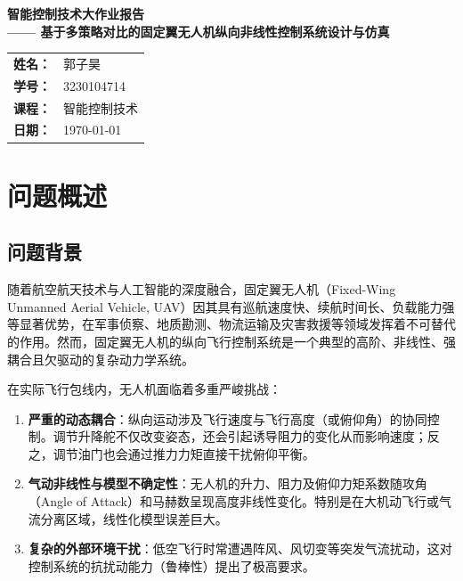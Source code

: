 \documentclass[UTF8, a4paper, 12pt]{ctexart}
\begin{document}
\begin{center}
    \vspace*{1cm}
    \huge\bfseries 智能控制技术大作业报告\\[0.5cm]
    \Large —— 基于多策略对比的固定翼无人机纵向非线性控制系统设计与仿真\\[2cm]
    
    \large
    \begin{tabular}{rl}
        \textbf{姓名：} & 郭子昊 \\
        \textbf{学号：} & 3230104714 \\
        \textbf{课程：} & 智能控制技术 \\
        \textbf{日期：} & \today \\
    \end{tabular}
\end{center}
\vspace{2cm}
\thispagestyle{empty}
\newpage
\setcounter{page}{1}


\section{问题概述}

\subsection{问题背景}
随着航空航天技术与人工智能的深度融合，固定翼无人机（Fixed-Wing Unmanned Aerial Vehicle, UAV）因其具有巡航速度快、续航时间长、负载能力强等显著优势，在军事侦察、地质勘测、物流运输及灾害救援等领域发挥着不可替代的作用。然而，固定翼无人机的纵向飞行控制系统是一个典型的高阶、非线性、强耦合且欠驱动的复杂动力学系统。

在实际飞行包线内，无人机面临着多重严峻挑战：
\begin{enumerate}
    \item \textbf{严重的动态耦合}：纵向运动涉及飞行速度与飞行高度（或俯仰角）的协同控制。调节升降舵不仅改变姿态，还会引起诱导阻力的变化从而影响速度；反之，调节油门也会通过推力力矩直接干扰俯仰平衡。
    \item \textbf{气动非线性与模型不确定性}：无人机的升力、阻力及俯仰力矩系数随攻角（Angle of Attack）和马赫数呈现高度非线性变化。特别是在大机动飞行或气流分离区域，线性化模型误差巨大。
    \item \textbf{复杂的外部环境干扰}：低空飞行时常遭遇阵风、风切变等突发气流扰动，这对控制系统的抗扰动能力（鲁棒性）提出了极高要求。
\end{enumerate}
\end{document}
